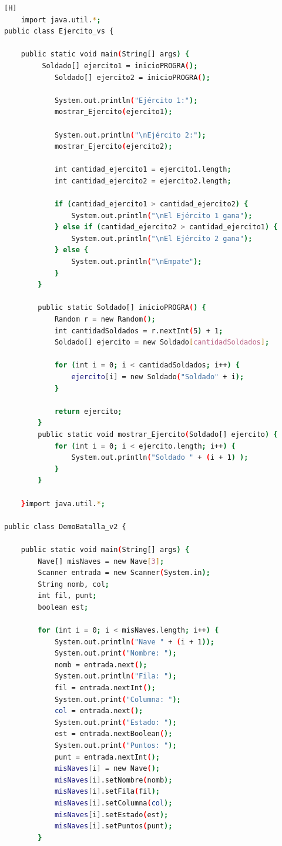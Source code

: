 \documentclass{article}
\begin{document}
			\begin{lstlisting}[language=bash,caption={Creando la clase Ejercito_vs}][H]
	import java.util.*;
public class Ejercito_vs {

	public static void main(String[] args) {
		 Soldado[] ejercito1 = inicioPROGRA();
	        Soldado[] ejercito2 = inicioPROGRA();

	        System.out.println("Ejército 1:");
	        mostrar_Ejercito(ejercito1);

	        System.out.println("\nEjército 2:");
	        mostrar_Ejercito(ejercito2);

	        int cantidad_ejercito1 = ejercito1.length;
	        int cantidad_ejercito2 = ejercito2.length;

	        if (cantidad_ejercito1 > cantidad_ejercito2) {
	            System.out.println("\nEl Ejército 1 gana");
	        } else if (cantidad_ejercito2 > cantidad_ejercito1) {
	            System.out.println("\nEl Ejército 2 gana");
	        } else {
	            System.out.println("\nEmpate");
	        }
	    }

	    public static Soldado[] inicioPROGRA() {
	        Random r = new Random();
	        int cantidadSoldados = r.nextInt(5) + 1;
	        Soldado[] ejercito = new Soldado[cantidadSoldados];

	        for (int i = 0; i < cantidadSoldados; i++) {
	            ejercito[i] = new Soldado("Soldado" + i);
	        }

	        return ejercito;
	    }
	    public static void mostrar_Ejercito(Soldado[] ejercito) {
	        for (int i = 0; i < ejercito.length; i++) {
	            System.out.println("Soldado " + (i + 1) );
	        }
	    }
	
	}import java.util.*;

public class DemoBatalla_v2 {

    public static void main(String[] args) {
        Nave[] misNaves = new Nave[3];
        Scanner entrada = new Scanner(System.in);
        String nomb, col;
        int fil, punt;
        boolean est;

        for (int i = 0; i < misNaves.length; i++) {
            System.out.println("Nave " + (i + 1));
            System.out.print("Nombre: ");
            nomb = entrada.next();
            System.out.println("Fila: ");
            fil = entrada.nextInt();
            System.out.print("Columna: ");
            col = entrada.next();
            System.out.print("Estado: ");
            est = entrada.nextBoolean();
            System.out.print("Puntos: ");
            punt = entrada.nextInt();
            misNaves[i] = new Nave();
            misNaves[i].setNombre(nomb);
            misNaves[i].setFila(fil);
            misNaves[i].setColumna(col);
            misNaves[i].setEstado(est);
            misNaves[i].setPuntos(punt);
        }


\end{lstlisting}
\end{document}
